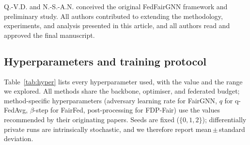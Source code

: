\documentclass[pdflatex,sn-mathphys-num]{sn-jnl}
\theoremstyle{thmstyleone}%
\theoremstyle{thmstyletwo}%
\theoremstyle{thmstylethree}%
\providecommand{\DIFadd}[1]{{\protect\color{blue}\uwave{#1}}} %
\providecommand{\DIFaddbegin}{} %
\providecommand{\DIFaddend}{} %
\providecommand{\DIFdelbegin}{} %
\providecommand{\DIFdelend}{} %
\providecommand{\DIFscaledelfig}{0.5}
\newlength{\DIFdelgraphicswidth} %
\newlength{\DIFdelgraphicsheight} %
\providecommand{\DIFaddincludegraphics}[2][]{{\color{blue}\fbox{\DIFOincludegraphics[#1]{#2}}}} %
\providecommand{\DIFdelincludegraphics}[2][]{%
\sbox{\DIFdelgraphicsbox}{\DIFOincludegraphics[#1]{#2}}%
\settoboxwidth{\DIFdelgraphicswidth}{\DIFdelgraphicsbox} %
\settoboxtotalheight{\DIFdelgraphicsheight}{\DIFdelgraphicsbox} %
\scalebox{\DIFscaledelfig}{%
\parbox[b]{\DIFdelgraphicswidth}{\usebox{\DIFdelgraphicsbox}\\[-\baselineskip] \rule{\DIFdelgraphicswidth}{0em}}\llap{\resizebox{\DIFdelgraphicswidth}{\DIFdelgraphicsheight}{%
\setlength{\unitlength}{\DIFdelgraphicswidth}%
\begin{picture}(1,1)%
\thicklines\linethickness{2pt} %
{\color[rgb]{1,0,0}\put(0,0){\framebox(1,1){}}}%
{\color[rgb]{1,0,0}\put(0,0){\line( 1,1){1}}}%
{\color[rgb]{1,0,0}\put(0,1){\line(1,-1){1}}}%
\end{picture}%
}\hspace*{3pt}}} %
} %
\DeclareRobustCommand{\DIFaddbegin}{\DIFOaddbegin \let\includegraphics\DIFaddincludegraphics} %
\DeclareRobustCommand{\DIFaddend}{\DIFOaddend \let\includegraphics\DIFOincludegraphics} %
\DeclareRobustCommand{\DIFdelbegin}{\DIFOdelbegin \let\includegraphics\DIFdelincludegraphics} %
\DeclareRobustCommand{\DIFdelend}{\DIFOaddend \let\includegraphics\DIFOincludegraphics} %
\begin{document}
\DIFaddend Q.-V.D. and N.-S.-A.N. conceived the original FedFairGNN framework and \DIFaddbegin \DIFadd{the
}\DIFaddend preliminary study. All authors contributed to extending the methodology,
experiments, and analysis presented in this article, and all authors read and
approved the final manuscript.
\DIFdelbegin %
\DIFdelend 

\begin{appendices}

\section{Hyperparameters and training protocol}
\label{app:hyper}
Table~\ref{tab:hyper} lists every hyperparameter used, with the value and the
range we explored. All methods share the backbone, optimiser, and federated
budget; method-specific hyperparameters (adversary learning rate for FairGNN,
$q$ for q-FedAvg, $\beta$-step for FairFed, post-processing for FDP-Fair) use the
values recommended by their originating papers. Seeds are fixed
($\{0,1,2\}$); differentially private runs are intrinsically stochastic, and we
therefore report mean\,$\pm$\,standard deviation.


\end{appendices}
\end{document}
